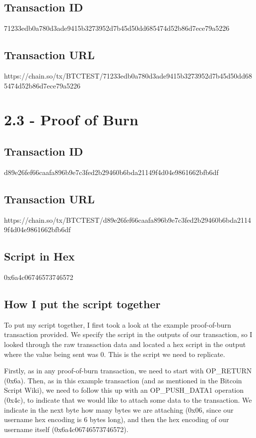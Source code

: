 \documentclass[11pt]{article}
\begin{document}
	\subsection*{Transaction ID}
	71233edb0a780d3ade9415b3273952d7b45d50dd685474d52b86d7ece79a5226
	
	\subsection*{Transaction URL} https://chain.so/tx/BTCTEST/71233edb0a780d3ade9415b3273952d7b45d50dd685474d52b86d7ece79a5226
	
	\newpage
	
	
	\section*{2.3 - Proof of Burn}
	\subsection*{Transaction ID}
	d89e26fef66caafa896b9e7c3fed2b29460b6bda21149f4d04e9861662bfb6df
	
	\subsection*{Transaction URL}
	https://chain.so/tx/BTCTEST/d89e26fef66caafa896b9e7c3fed2b29460b6bda21149f4d04e9861662bfb6df
	
	\subsection*{Script in Hex}
	0x6a4c06746573746572
	
	\subsection*{How I put the script together}
	To put my script together, I first took a look at the example proof-of-burn transaction provided. We specify the script in the outputs of our transaction, so I looked through the raw transaction data and located a hex script in the output where the value being sent was 0. This is the script we need to replicate. \newline
	
	Firstly, as in any proof-of-burn transaction, we need to start with OP\_RETURN (0x6a). Then, as in this example transaction (and as mentioned in the Bitcoin Script Wiki), we need to follow this up with an OP\_PUSH\_DATA1 operation (0x4c), to indicate that we would like to attach some data to the transaction. We indicate in the next byte how many bytes we are attaching (0x06, since our username hex encoding is 6 bytes long), and then the hex encoding of our username itself (0x6a4c06746573746572). \newline
	
\end{document}
